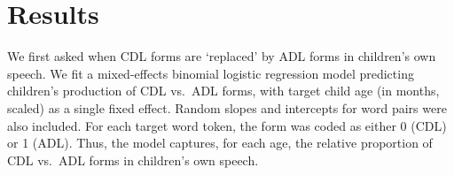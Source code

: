 \documentclass[10pt, letterpaper]{article}
\begin{document}
\begin{table}[ht]
\centering
{}
\caption{CHILDES frequency for 15 CDL/ADL word pairs. Child-produced
                             counts include tokens produced only by the target child.} 
\label{tab:tab1}
\end{table}

\hypertarget{results}{%
\section{Results}\label{results}}

We first asked when CDL forms are `replaced' by ADL forms in children's
own speech. We fit a mixed-effects binomial logistic regression model
predicting children's production of CDL vs.~ADL forms, with target child
age (in months, scaled) as a single fixed effect. Random slopes and
intercepts for word pairs were also included. For each target word
token, the form was coded as either 0 (CDL) or 1 (ADL). Thus, the model
captures, for each age, the relative proportion of CDL vs.~ADL forms in
children's own speech.
\end{document}
